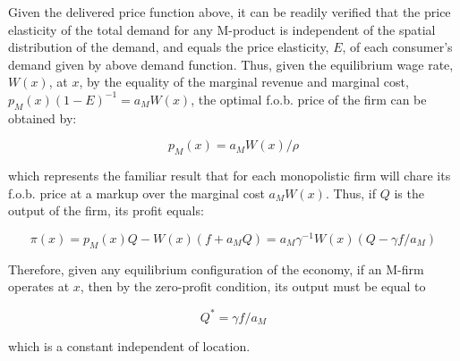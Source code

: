 Given the delivered price function above, it can be readily verified that the price elasticity of the total demand for any M-product is independent of the spatial distribution of the demand, and equals the price elasticity, $E$, of each consumer's demand given by above demand function. Thus, given the equilibrium wage rate, $W(x)$, at $x$, by the equality of the marginal revenue and marginal cost, $p_M(x) (1 - E)^{-1} = a_M W(x)$, the optimal f.o.b. price of the firm can be obtained by:

\begin{equation}
  p_M(x) = a_M W(x) / \rho
\end{equation}

which represents the familiar result that for each monopolistic firm will chare its f.o.b. price at a markup over the marginal cost $a_M W(x)$. Thus, if $Q$ is the output of the firm, its profit equals:

\begin{equation}
  \pi(x) = p_M(x) Q - W(x)(f + a_M Q) = a_M \gamma^{-1} W(x)(Q - \gamma f / a_M)
\end{equation}

Therefore, given any equilibrium configuration of the economy, if an M-firm operates at $x$, then by the zero-profit condition, its output must be equal to

\begin{equation}
  Q^* = \gamma f / a_M
\end{equation}

which is a constant independent of location.
